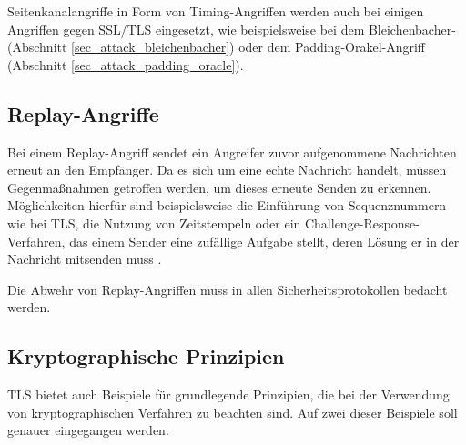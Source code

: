 Seitenkanalangriffe in Form von Timing-Angriffen werden auch bei einigen Angriffen gegen SSL/TLS eingesetzt, wie beispielsweise bei dem Bleichenbacher- (Abschnitt \ref{sec_attack_bleichenbacher}) oder dem Padding-Orakel-Angriff (Abschnitt \ref{sec_attack_padding_oracle}).

\subsection{Replay-Angriffe}

Bei einem Replay-Angriff sendet ein Angreifer zuvor aufgenommene Nachrichten erneut an den Empfänger. Da es sich um eine echte Nachricht handelt, müssen Gegenmaßnahmen getroffen werden, um dieses erneute Senden zu erkennen. Möglichkeiten hierfür sind beispielsweise die Einführung von Sequenznummern wie bei TLS, die Nutzung von Zeitstempeln oder ein Challenge-Response-Verfahren, das einem Sender eine zufällige Aufgabe stellt, deren Lösung er in der Nachricht mitsenden muss \cite{ferguson10}.

Die Abwehr von Replay-Angriffen muss in allen Sicherheitsprotokollen bedacht werden.

\subsection{Kryptographische Prinzipien}
\label{sec_didactics_crypto}


TLS bietet auch Beispiele für grundlegende Prinzipien, die bei der Verwendung von kryptographischen Verfahren zu beachten sind. Auf zwei dieser Beispiele soll genauer eingegangen werden.

